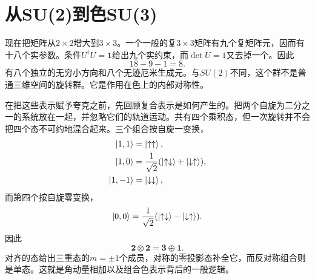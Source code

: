 \begin{classroomqa}
\end{classroomqa}

\begin{classroomqa}
\end{classroomqa}

\section{从SU(2)到色SU(3)}

现在把矩阵从\(2\times2\)增大到\(3\times3\)。一个一般的复\(3\times3\)矩阵有九个复矩阵元，因而有十八个实参数。条件\(U^\dagger U=\boldsymbol 1\)给出九个实约束，而\(\det U=1\)又去掉一个。因此
\begin{equation}
18-9-1=8.
\end{equation}
有八个独立的无穷小方向和八个无迹厄米生成元。与\(SU(2)\)不同，这个群不是普通三维空间的旋转群。它是作用在色上的内部对称性。

在把这些表示赋予夸克之前，先回顾复合表示是如何产生的。把两个自旋为二分之一的系统放在一起，并忽略它们的轨道运动。共有四个乘积态，但一次旋转并不会把四个态不可约地混合起来。三个组合按自旋一变换，
\begin{align}
\left\lvert1,1\right\rangle&=\left\lvert\uparrow\uparrow\right\rangle,\\
\left\lvert1,0\right\rangle&=\frac{1}{\sqrt2}
(\left\lvert\uparrow\downarrow\right\rangle+\left\lvert\downarrow\uparrow\right\rangle),\\
\left\lvert1,-1\right\rangle&=\left\lvert\downarrow\downarrow\right\rangle,
\end{align}
而第四个按自旋零变换，
\begin{equation}
\left\lvert0,0\right\rangle=\frac{1}{\sqrt2}
(\left\lvert\uparrow\downarrow\right\rangle-\left\lvert\downarrow\uparrow\right\rangle).
\end{equation}
因此
\begin{equation}
\boldsymbol 2\otimes\boldsymbol 2
=\boldsymbol 3\oplus\boldsymbol 1.
\label{eq:l4-two-spin-decomposition}
\end{equation}
对齐的态给出三重态的\(m=\pm1\)个成员，对称的零投影态补全它，而反对称组合则是单态。这就是角动量相加以及组合色表示背后的一般逻辑。

